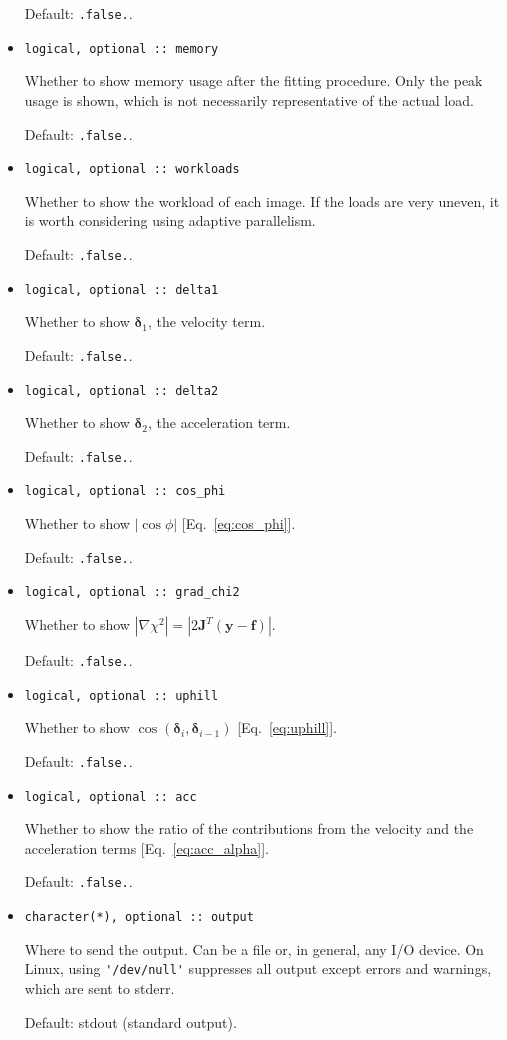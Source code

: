 \documentclass{article}
\begin{document}
\begin{itemize}
  Default: \verb+.false.+.
\item 
\begin{verbatim}
logical, optional :: memory
\end{verbatim}
  Whether to show memory usage after the fitting procedure. Only the
  peak usage is shown, which is not necessarily representative of the
  actual load.

  Default: \verb+.false.+.
\item 
\begin{verbatim}
logical, optional :: workloads
\end{verbatim}
  Whether to show the workload of each image. If the loads are very
  uneven, it is worth considering using adaptive parallelism.

  Default: \verb+.false.+.
\item 
\begin{verbatim}
logical, optional :: delta1
\end{verbatim}
  Whether to show $\bm\delta_1$, the velocity term.

  Default: \verb+.false.+.
\item 
\begin{verbatim}
logical, optional :: delta2
\end{verbatim}
  Whether to show $\bm\delta_2$, the acceleration term.

  Default: \verb+.false.+.
\item 
\begin{verbatim}
logical, optional :: cos_phi
\end{verbatim}
  Whether to show $|\cos\phi|$ [Eq.~\eqref{eq:cos_phi}].

  Default: \verb+.false.+.
\item 
\begin{verbatim}
logical, optional :: grad_chi2
\end{verbatim}
  Whether to show $|\nabla \chi^2| = |2\bm J^T (\bm y - \bm f)|$.

  Default: \verb+.false.+.
\item 
\begin{verbatim}
logical, optional :: uphill
\end{verbatim}
  Whether to show $\cos(\bm\delta_i,\bm\delta_{i-1})$
  [Eq.~\eqref{eq:uphill}].

  Default: \verb+.false.+.
\item 
\begin{verbatim}
logical, optional :: acc
\end{verbatim}
  Whether to show the ratio of the contributions from the velocity and
  the acceleration terms [Eq.~\eqref{eq:acc_alpha}].

  Default: \verb+.false.+.
\item 
\begin{verbatim}
character(*), optional :: output
\end{verbatim}
  Where to send the output. Can be a file or, in general, any I/O
  device. On Linux, using \verb+'/dev/null'+ suppresses all output
  except errors and warnings, which are sent to stderr.

  Default: stdout (standard output).
\end{itemize}
\end{document}
